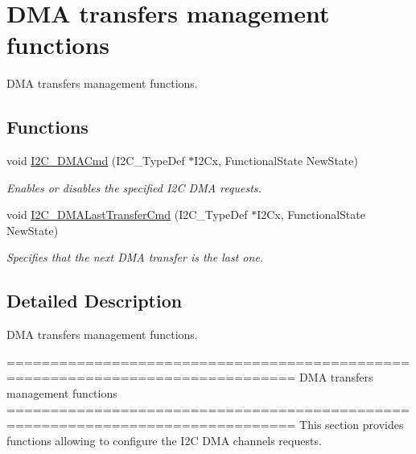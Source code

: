 \hypertarget{group___i2_c___group4}{\section{D\-M\-A transfers management functions}
\label{group___i2_c___group4}
}


D\-M\-A transfers management functions.  


\subsection*{Functions}
\begin{DoxyCompactItemize}
\item 
void \hyperlink{group___i2_c___group4_ga38502ce11e5ec923e0f6476aaa35b45c}{I2\-C\-\_\-\-D\-M\-A\-Cmd} (I2\-C\-\_\-\-Type\-Def $\ast$I2\-Cx, Functional\-State New\-State)
\begin{DoxyCompactList}\small\item\em Enables or disables the specified I2\-C D\-M\-A requests. \end{DoxyCompactList}\item 
void \hyperlink{group___i2_c___group4_gab2e994c5681eb6ec7c26a03ffe1de060}{I2\-C\-\_\-\-D\-M\-A\-Last\-Transfer\-Cmd} (I2\-C\-\_\-\-Type\-Def $\ast$I2\-Cx, Functional\-State New\-State)
\begin{DoxyCompactList}\small\item\em Specifies that the next D\-M\-A transfer is the last one. \end{DoxyCompactList}\end{DoxyCompactItemize}


\subsection{Detailed Description}
D\-M\-A transfers management functions. \begin{DoxyVerb} ===============================================================================
                         DMA transfers management functions
 ===============================================================================  
  This section provides functions allowing to configure the I2C DMA channels 
  requests.\end{DoxyVerb}
 


